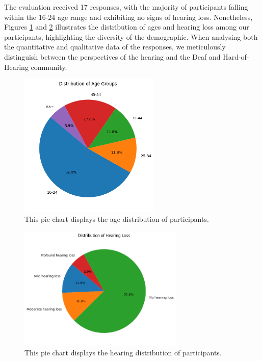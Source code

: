 \documentclass{l4proj}
\begin{document}
The evaluation received 17 responses, with the majority of participants falling within the 16-24 age range and exhibiting no signs of hearing loss. Nonetheless, Figures \ref{fig:ages} and \ref{fig:hearing} illustrates the distribution of ages and hearing loss among our participants, highlighting the diversity of the demographic. When analysing both the quantitative and qualitative data of the responses, we meticulously distinguish between the perspectives of the hearing and the Deaf and Hard-of-Hearing community.

\begin{figure}
    \centering
    \includegraphics[width=0.6\textwidth]{dissertation/images/ages.png}
    \caption{This pie chart displays the age distribution of participants.}
    \label{fig:ages}
\end{figure}

\begin{figure}
    \centering
    \includegraphics[width=0.7\textwidth]{dissertation/images/hearing.png}
    \caption{This pie chart displays the hearing distribution of participants.}
    \label{fig:hearing}
\end{figure}
\end{document}
